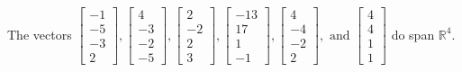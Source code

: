 \begin{exercise}
\begin{exerciseStatement}
  \end{exerciseStatement}
  \begin{exerciseAnswer}
   The vectors \(\left[\begin{array}{r}
-1 \\
-5 \\
-3 \\
2
\end{array}\right] , \left[\begin{array}{r}
4 \\
-3 \\
-2 \\
-5
\end{array}\right] , \left[\begin{array}{r}
2 \\
-2 \\
2 \\
3
\end{array}\right] , \left[\begin{array}{r}
-13 \\
17 \\
1 \\
-1
\end{array}\right] , \left[\begin{array}{r}
4 \\
-4 \\
-2 \\
2
\end{array}\right] , \text{ and } \left[\begin{array}{r}
4 \\
4 \\
1 \\
1
\end{array}\right]\) 
  	 do  
	span \(\mathbb{R}^4\).
  


  \end{exerciseAnswer}
\end{exercise}